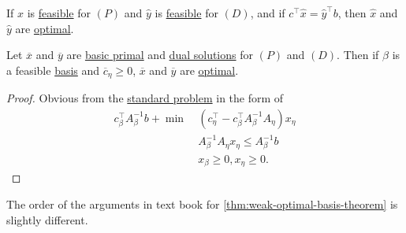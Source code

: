 \begin{corollary}\label{col:lec7-1}
	If \(\hat{x}\) is \hyperref[def:feasible-solution]{feasible} for \((P)\) and \(\hat{y}\) is \hyperref[def:feasible-solution]{feasible} for \((D)\), and if
	\(c^{\top}\hat{x} = \hat{y}^{\top} b\), then \(\hat{x}\) and \(\hat{y}\) are \hyperref[def:optimal-solution]{optimal}.
\end{corollary}

\begin{theorem}\label{thm:weak-optimal-basis-theorem}
	Let \(\overline{x}\) and \(\overline{y}\) are \hyperref[def:basic-solution]{basic primal} and \hyperref[def:dual-basic-solution]{dual solutions} for \((P)\) and \((D)\).
	Then if \(\beta\) is a feasible \hyperref[def:basic]{basis} and \(\overline{c}_{\eta}\geq 0\), \(\overline{x}\) and \(\overline{y}\) are \hyperref[def:optimal-solution]{optimal}.
\end{theorem}
\begin{proof}
	Obvious from the \hyperref[def:standard-form]{standard problem} in the form of
	\[
		\begin{aligned}
			c^{\top}_{\beta}A^{-1}_{\beta}b + \min~ & (c_{\eta}^{\top} - c_{\beta}^{\top}A^{-1}_{\beta}A_{\eta})x_{\eta} \\
			                                        & A^{-1}_{\beta}A_{\eta}x_{\eta} \leq A^{-1}_{\beta}b                \\
			                                        & x_{\beta}\geq 0, x_{\eta}\geq 0.
		\end{aligned}
	\]
\end{proof}

\begin{note}
	The order of the arguments in text book for \autoref{thm:weak-optimal-basis-theorem} is slightly different.
\end{note}

